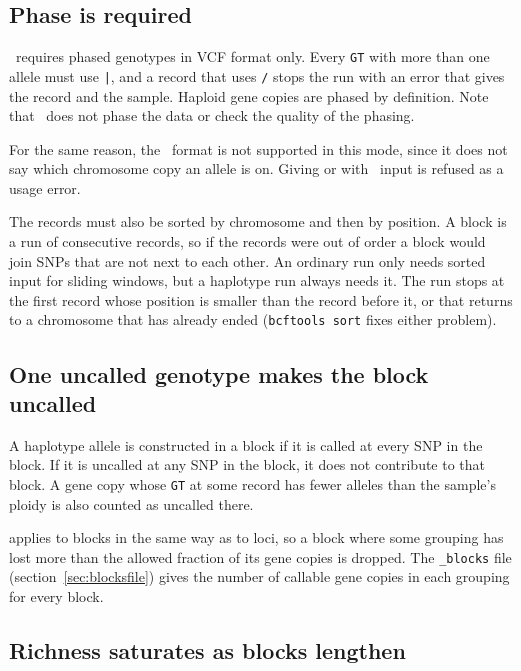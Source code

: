\subsection{Phase is required}

\prog\ requires phased genotypes in VCF format only. Every \texttt{GT} with more than one allele must use \texttt{|}, and
a record that uses \texttt{/} stops the run with an error that gives the record
and the sample. Haploid gene copies are phased by definition. Note that \prog\
does not phase the data or check the quality of the phasing. 

For the same reason, the \structureprog\ format is not supported in this mode,
since it does not say which chromosome copy an allele is on. Giving
\flag{--hap-snps} or \flag{--hap-bp} with \structureprog\ input is refused as a
usage error.

The records must also be sorted by chromosome and then by position. A block is
a run of consecutive records, so if the records were out of order a block would
join SNPs that are not next to each other. An ordinary run only needs sorted
input for sliding windows, but a haplotype run always needs it. The run stops
at the first record whose position is smaller than the record before it, or
that returns to a chromosome that has already ended (\texttt{bcftools sort}
fixes either problem).

\subsection{One uncalled genotype makes the block uncalled}

A haplotype allele is constructed in a block if it is called at every
SNP in the block. If it is uncalled at any SNP in the block, it does not
contribute to that block. A gene copy whose \texttt{GT} at some record has fewer
alleles than the sample's ploidy is also counted as uncalled there.

 applies to blocks in the same way as to loci, so a block
where some grouping has lost more than the allowed fraction of its gene copies
is dropped. The \texttt{\_blocks} file (section~\ref{sec:blocksfile}) gives
the number of callable gene copies in each grouping for every block.

\subsection{Richness saturates as blocks lengthen}

